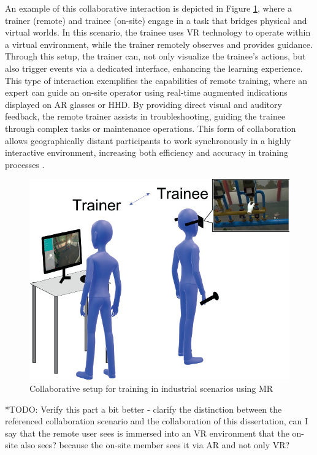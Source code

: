     An example of this collaborative interaction is depicted in Figure \ref{fig:mr-collab-example}, where a trainer (remote) and trainee (on-site) engage in a task that bridges physical and virtual worlds. In this scenario, the trainee uses \ac{VR} technology to operate within a virtual environment, while the trainer remotely observes and provides guidance. Through this setup, the trainer can, not only visualize the trainee's actions, but also trigger events via a dedicated interface, enhancing the learning experience. This type of interaction exemplifies the capabilities of remote training, where an expert can guide an on-site operator using real-time augmented indications displayed on \ac{AR} glasses or \ac{HHD}. By providing direct visual and auditory feedback, the remote trainer assists in troubleshooting, guiding the trainee through complex tasks or maintenance operations. This form of collaboration allows geographically distant participants to work synchronously in a highly interactive environment, increasing both efficiency and accuracy in training processes \cite{Mayer2023}.
  
    \begin{figure}[h]
        \centering
        \includegraphics[width=0.7\linewidth]{figs/mr-example-collab.png}
        \caption{Collaborative setup for training in industrial scenarios using \ac{MR} \cite{Mayer2023}}
        \label{fig:mr-collab-example}
    \end{figure}

    *TODO: Verify this part a bit better - clarify the distinction between the referenced collaboration scenario and the collaboration of this dissertation, can I say that the remote user sees is immersed into an VR environment that the on-site also sees? because the on-site member sees it via AR and not only VR? 
    
